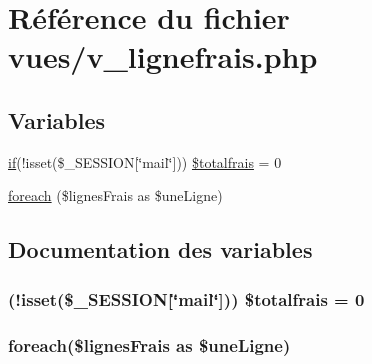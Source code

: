 \hypertarget{v__lignefrais_8php}{}\section{Référence du fichier vues/v\+\_\+lignefrais.php}
\label{v__lignefrais_8php}
\subsection*{Variables}
\begin{DoxyCompactItemize}
\item 
\hyperlink{bootstrap_8min_8js_ab46cc49ddd78779f76bf855060e8f4db}{if}(!isset(\$\+\_\+\+S\+E\+S\+S\+I\+O\+N\mbox{[}\char`\"{}mail\char`\"{}\mbox{]})) \hyperlink{v__lignefrais_8php_a151ab35fdfba7602629a33d3fc43c63a}{\$totalfrais} = 0
\item 
\hyperlink{v__lignefrais_8php_a736e1cc6ffa13dec53888814127b23d0}{foreach} (\$lignes\+Frais as \$une\+Ligne)
\end{DoxyCompactItemize}


\subsection{Documentation des variables}
\hypertarget{v__lignefrais_8php_a151ab35fdfba7602629a33d3fc43c63a}{}
\subsubsection[{\$totalfrais}]{ (!isset(\$\+\_\+\+S\+E\+S\+S\+I\+O\+N\mbox{[}\char`\"{}mail\char`\"{}\mbox{]})) \$totalfrais = 0}\label{v__lignefrais_8php_a151ab35fdfba7602629a33d3fc43c63a}
\hypertarget{v__lignefrais_8php_a736e1cc6ffa13dec53888814127b23d0}{}
\subsubsection[{foreach}]{\setlength{\rightskip}{0pt plus 5cm}foreach(\$lignes\+Frais as \$une\+Ligne)}\label{v__lignefrais_8php_a736e1cc6ffa13dec53888814127b23d0}
